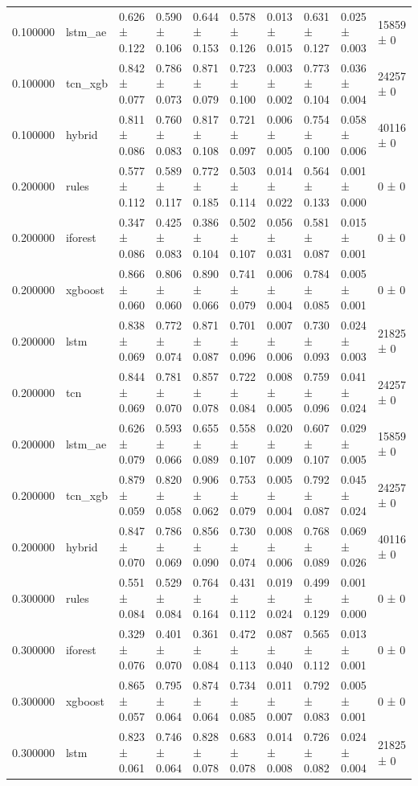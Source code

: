 \begin{tabular}{rlllllllll}
0.100000 & lstm\_ae & 0.626 ± 0.122 & 0.590 ± 0.106 & 0.644 ± 0.153 & 0.578 ± 0.126 & 0.013 ± 0.015 & 0.631 ± 0.127 & 0.025 ± 0.003 & 15859 ± 0 \\
0.100000 & tcn\_xgb & 0.842 ± 0.077 & 0.786 ± 0.073 & 0.871 ± 0.079 & 0.723 ± 0.100 & 0.003 ± 0.002 & 0.773 ± 0.104 & 0.036 ± 0.004 & 24257 ± 0 \\
0.100000 & hybrid & 0.811 ± 0.086 & 0.760 ± 0.083 & 0.817 ± 0.108 & 0.721 ± 0.097 & 0.006 ± 0.005 & 0.754 ± 0.100 & 0.058 ± 0.006 & 40116 ± 0 \\
0.200000 & rules & 0.577 ± 0.112 & 0.589 ± 0.117 & 0.772 ± 0.185 & 0.503 ± 0.114 & 0.014 ± 0.022 & 0.564 ± 0.133 & 0.001 ± 0.000 & 0 ± 0 \\
0.200000 & iforest & 0.347 ± 0.086 & 0.425 ± 0.083 & 0.386 ± 0.104 & 0.502 ± 0.107 & 0.056 ± 0.031 & 0.581 ± 0.087 & 0.015 ± 0.001 & 0 ± 0 \\
0.200000 & xgboost & 0.866 ± 0.060 & 0.806 ± 0.060 & 0.890 ± 0.066 & 0.741 ± 0.079 & 0.006 ± 0.004 & 0.784 ± 0.085 & 0.005 ± 0.001 & 0 ± 0 \\
0.200000 & lstm & 0.838 ± 0.069 & 0.772 ± 0.074 & 0.871 ± 0.087 & 0.701 ± 0.096 & 0.007 ± 0.006 & 0.730 ± 0.093 & 0.024 ± 0.003 & 21825 ± 0 \\
0.200000 & tcn & 0.844 ± 0.069 & 0.781 ± 0.070 & 0.857 ± 0.078 & 0.722 ± 0.084 & 0.008 ± 0.005 & 0.759 ± 0.096 & 0.041 ± 0.024 & 24257 ± 0 \\
0.200000 & lstm\_ae & 0.626 ± 0.079 & 0.593 ± 0.066 & 0.655 ± 0.089 & 0.558 ± 0.107 & 0.020 ± 0.009 & 0.607 ± 0.107 & 0.029 ± 0.005 & 15859 ± 0 \\
0.200000 & tcn\_xgb & 0.879 ± 0.059 & 0.820 ± 0.058 & 0.906 ± 0.062 & 0.753 ± 0.079 & 0.005 ± 0.004 & 0.792 ± 0.087 & 0.045 ± 0.024 & 24257 ± 0 \\
0.200000 & hybrid & 0.847 ± 0.070 & 0.786 ± 0.069 & 0.856 ± 0.090 & 0.730 ± 0.074 & 0.008 ± 0.006 & 0.768 ± 0.089 & 0.069 ± 0.026 & 40116 ± 0 \\
0.300000 & rules & 0.551 ± 0.084 & 0.529 ± 0.084 & 0.764 ± 0.164 & 0.431 ± 0.112 & 0.019 ± 0.024 & 0.499 ± 0.129 & 0.001 ± 0.000 & 0 ± 0 \\
0.300000 & iforest & 0.329 ± 0.076 & 0.401 ± 0.070 & 0.361 ± 0.084 & 0.472 ± 0.113 & 0.087 ± 0.040 & 0.565 ± 0.112 & 0.013 ± 0.001 & 0 ± 0 \\
0.300000 & xgboost & 0.865 ± 0.057 & 0.795 ± 0.064 & 0.874 ± 0.064 & 0.734 ± 0.085 & 0.011 ± 0.007 & 0.792 ± 0.083 & 0.005 ± 0.001 & 0 ± 0 \\
0.300000 & lstm & 0.823 ± 0.061 & 0.746 ± 0.064 & 0.828 ± 0.078 & 0.683 ± 0.078 & 0.014 ± 0.008 & 0.726 ± 0.082 & 0.024 ± 0.004 & 21825 ± 0 \\

\end{tabular}
